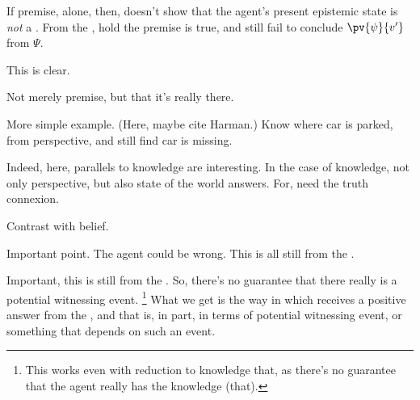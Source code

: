 \begin{note}
  \begin{argument}
    If premise, alone, then, doesn't show that the agent's present epistemic state is \emph{not} a \deadEnd{}.
    From the \agpe{}, hold the premise is true, and still fail to conclude \(\pv{\psi}{v'}\) from \(\Psi\).

    This is clear.

    Not merely premise, but that it's really there.

    More simple example.
    (Here, maybe cite Harman.)
    Know where car is parked, from perspective, and still find car is missing.

    Indeed, here, parallels to knowledge are interesting.
    In the case of knowledge, not only perspective, but also state of the world answers.
    For, need the truth connexion.

    Contrast with belief.

    Important point.
    The agent could be wrong.
    This is all still from the \agpe{}.
  \end{argument}

  Important, this is still from the \agpe{}.
  So, there's no guarantee that there really is a potential witnessing event.%
  \footnote{
    This works even with reduction to knowledge that, as there's no guarantee that the agent really has the knowledge (that).
  }
  What we get is the way in which \qzS{} receives a positive answer from the \agpe{}, and that is, in part, in terms of potential witnessing event, or something that depends on such an event.
\end{note}



